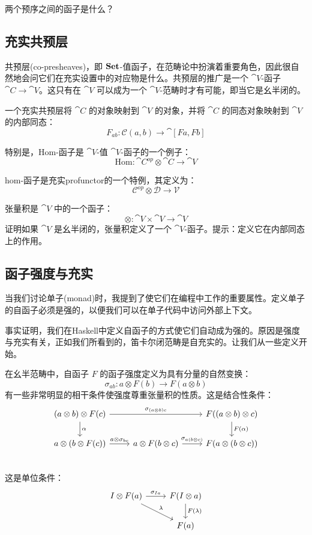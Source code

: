 \documentclass[DaoFP]{subfiles}
\begin{document}
\begin{exercise}
两个预序之间的函子是什么？
\end{exercise}

\subsection{充实共预层}
共预层(co-presheaves)，即 $\mathbf{Set}$-值函子，在范畴论中扮演着重要角色，因此很自然地会问它们在充实设置中的对应物是什么。共预层的推广是一个 $\cat V$-函子 $\cat C \to \cat V$。这只有在 $\cat V$ 可以成为一个 $\cat V$-范畴时才有可能，即当它是幺半闭的。

一个充实共预层将 $\cat C$ 的对象映射到 $\cat V$ 的对象，并将 $\cat C$ 的同态对象映射到 $\cat V$ 的内部同态：
\[ F_{a b} \colon \mathcal C (a, b) \to \cat [F a, F b] \]

特别是，$\text{Hom}$-函子是 $\cat V$-值 $\cat V$-函子的一个例子：
\[ \text{Hom} \colon \cat C^{op} \otimes \cat C \to \cat V \]

hom-函子是充实profunctor的一个特例，其定义为：
\[ \mathcal C^{op} \otimes \mathcal D \to \mathcal V \]

\begin{exercise}
张量积是 $\cat V$ 中的一个函子：
\[ \otimes \colon \cat V \times \cat V \to \cat V \]
证明如果 $\cat V$ 是幺半闭的，张量积定义了一个 $\cat V$-函子。提示：定义它在内部同态上的作用。
\end{exercise}

\subsection{函子强度与充实}

当我们讨论单子(monad)时，我提到了使它们在编程中工作的重要属性。定义单子的自函子必须是强的，以便我们可以在单子代码中访问外部上下文。

事实证明，我们在Haskell中定义自函子的方式使它们自动成为强的。原因是强度与充实有关，正如我们所看到的，笛卡尔闭范畴是自充实的。让我们从一些定义开始。

在幺半范畴中，自函子 $F$ 的函子强度定义为具有分量的自然变换：
\[ \sigma_{a b} \colon a \otimes F(b) \to F (a \otimes b) \]
有一些非常明显的相干条件使强度尊重张量积的性质。这是结合性条件：
\[
 \begin{tikzcd}
 (a \otimes b) \otimes F (c) 
 \arrow[rr, "\sigma_{(a \otimes b) c}"]
 \arrow[d, "\alpha"]
 && F((a \otimes b) \otimes c)
 \arrow[d, "F(\alpha)"]
 \\
 a \otimes (b \otimes F(c))
 \arrow[r, "a \otimes \sigma_{b c}"]
 & a \otimes F(b \otimes c)
 \arrow[r, "\sigma_{a (b \otimes c)}"]
 & F(a \otimes (b \otimes c))
 \\
 \end{tikzcd}
\]
这是单位条件：
\[
 \begin{tikzcd}
 I \otimes F(a)
 \arrow[r, "\sigma_{I a}"]
 \arrow[rd, "\lambda"]
 & F(I \otimes a)
 \arrow[d, "F (\lambda)"]
 \\
 & F(a)
 \end{tikzcd}
\]
\end{document}
